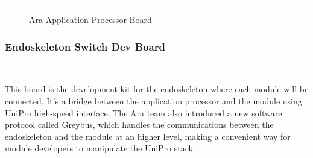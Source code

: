 \begin{figure}[htbp]
  \centering
    \rule{35em}{0.5pt}
  \caption[Ara Application Processor Board]{Ara Application Processor Board}
  \label{fig:ap-board}
\end{figure}

\subsubsection{Endoskeleton Switch Dev Board}\

This board is the development kit for the endoskeleton where each module will be connected.
It's a bridge between the application processor and the module using UniPro high-speed interface.
The Ara team also introduced a new software protocol called Greybus, which handles the communications between the endoskeleton and the module at an higher level, making a convenient way for module developers to manipulate the UniPro stack.

